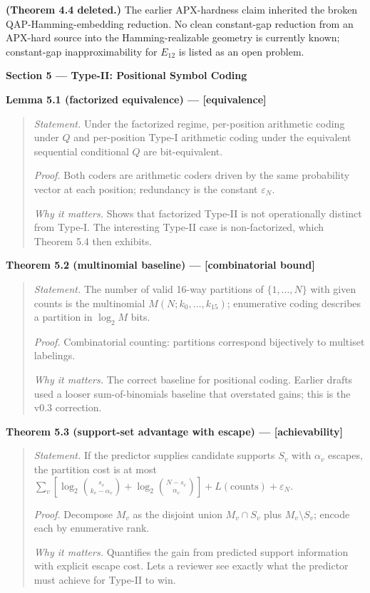 \documentclass[
]{article}
\begin{document}
\textbf{(Theorem 4.4 deleted.)} The earlier APX-hardness claim
inherited the broken QAP-Hamming-embedding reduction. No clean
constant-gap reduction from an APX-hard source into the
Hamming-realizable geometry is currently known; constant-gap
inapproximability for $E_{12}$ is listed as an open problem.

\textbf{Section 5 --- Type-II: Positional Symbol Coding}

\textbf{Lemma 5.1 (factorized equivalence) --- {[}equivalence{]}}

\begin{quote}
\emph{Statement.} Under the factorized regime, per-position
arithmetic coding under $Q$ and per-position Type-I arithmetic
coding under the equivalent sequential conditional $Q$ are
bit-equivalent.

\emph{Proof.} Both coders are arithmetic coders driven by the same
probability vector at each position; redundancy is the constant
$\varepsilon_N$.

\emph{Why it matters.} Shows that factorized Type-II is not
operationally distinct from Type-I. The interesting Type-II case is
non-factorized, which Theorem 5.4 then exhibits.
\end{quote}

\textbf{Theorem 5.2 (multinomial baseline) --- {[}combinatorial
bound{]}}

\begin{quote}
\emph{Statement.} The number of valid 16-way partitions of
$\{1, \ldots, N\}$ with given counts is the multinomial
$M(N; k_0, \ldots, k_{15})$; enumerative coding describes a partition
in $\log_2 M$ bits.

\emph{Proof.} Combinatorial counting: partitions correspond
bijectively to multiset labelings.

\emph{Why it matters.} The correct baseline for positional coding.
Earlier drafts used a looser sum-of-binomials baseline that
overstated gains; this is the v0.3 correction.
\end{quote}

\textbf{Theorem 5.3 (support-set advantage with escape) ---
{[}achievability{]}}

\begin{quote}
\emph{Statement.} If the predictor supplies candidate supports
$S_v$ with $\alpha_v$ escapes, the partition cost is at most
$\sum_v [\log_2 \binom{s_v}{k_v - \alpha_v} + \log_2 \binom{N - s_v}{\alpha_v}] + L(\text{counts}) + \varepsilon_N$.

\emph{Proof.} Decompose $M_v$ as the disjoint union $M_v \cap S_v$
plus $M_v \setminus S_v$; encode each by enumerative rank.

\emph{Why it matters.} Quantifies the gain from predicted support
information with explicit escape cost. Lets a reviewer see exactly
what the predictor must achieve for Type-II to win.
\end{quote}
\end{document}
